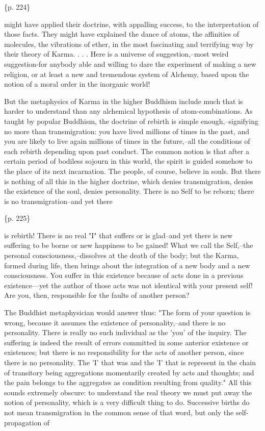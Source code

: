 \{p. 224\}

might have applied their doctrine, with appalling success, to the interpretation of those facts. They might have explained the dance of atoms, the affinities of molecules, the vibrations of ether, in the most fascinating and terrifying way by their theory of Karma. . . . Here is a universe of suggestion,--most weird suggestion-for anybody able and willing to dare the experiment of making a new religion, or at least a new and tremendous system of Alchemy, based upon the notion of a moral order in the inorganic world!



But the metaphysics of Karma in the higher Buddhism include much that is harder to understand than any alchemical hypothesis of atom-combinations. As taught by popular Buddhism, the doctrine of rebirth is simple enough,--signifying no more than transmigration: you have lived millions of times in the past, and you are likely to live again millions of times in the future,--all the conditions of each rebirth depending upon past conduct. The common notion is that after a certain period of bodiless sojourn in this world, the spirit is guided somehow to the place of its next incarnation. The people, of course, believe in souls. But there is nothing of all this in the higher doctrine, which denies transmigration, denies the existence of the soul, denies personality. There is no Self to be reborn; there is no transmigration--and yet there

\{p. 225\}

is rebirth! There is no real "I" that suffers or is glad--and yet there is new suffering to be borne or new happiness to be gained! What we call the Self,--the personal consciousness,--dissolves at the death of the body; but the Karma, formed during life, then brings about the integration of a new body and a new consciousness. You suffer in this existence because of acts done in a previous existence---yet the author of those acts was not identical with your present self! Are you, then, responsible for the faults of another person?

The Buddhist metaphysician would answer thus: "The form of your question is wrong, because it assumes the existence of personality,--and there is no personality. There is really no such individual as the 'you' of the inquiry. The suffering is indeed the result of errors committed in some anterior existence or existences; but there is no responsibility for the acts of another person, since there is no personality. The 'I' that was and the 'I' that is represent in the chain of transitory being aggregations momentarily created by acts and thoughts; and the pain belongs to the aggregates as condition resulting from quality." All this sounds extremely obscure: to understand the real theory we must put away the notion of personality, which is a very difficult thing to do. Successive births do not mean transmigration in the common sense of that word, but only the self-propagation of

